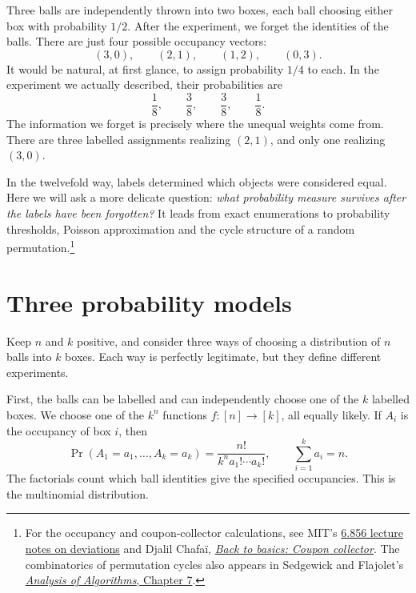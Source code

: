 
Three balls are independently thrown into two boxes, each ball choosing either box with probability \(1/2\). After the experiment, we forget the identities of the balls. There are just four possible occupancy vectors:
\[
 (3,0),\qquad(2,1),\qquad(1,2),\qquad(0,3).
\]
It would be natural, at first glance, to assign probability \(1/4\) to each. In the experiment we actually described, their probabilities are
\[
 \frac18,\qquad\frac38,\qquad\frac38,\qquad\frac18.
\]
The information we forget is precisely where the unequal weights come from. There are three labelled assignments realizing \((2,1)\), and only one realizing \((3,0)\).

In the twelvefold way, labels determined which objects were considered equal. Here we will ask a more delicate question: \emph{what probability measure survives after the labels have been forgotten?} It leads from exact enumerations to probability thresholds, Poisson approximation and the cycle structure of a random permutation.\footnote{For the occupancy and coupon-collector calculations, see MIT's \href{https://courses.csail.mit.edu/6.856/current/Notes/n05-deviations.html}{6.856 lecture notes on deviations} and Djalil Chafa\"i, \href{https://djalil.chafai.net/blog/2010/10/20/back-to-basics-coupon-collector/}{\emph{Back to basics: Coupon collector}}. The combinatorics of permutation cycles also appears in Sedgewick and Flajolet's \href{https://aofa.cs.princeton.edu/70permutations/}{\emph{Analysis of Algorithms}, Chapter 7}.}

\section{Three probability models}

Keep \(n\) and \(k\) positive, and consider three ways of choosing a distribution of \(n\) balls into \(k\) boxes. Each way is perfectly legitimate, but they define different experiments.

First, the balls can be labelled and can independently choose one of the \(k\) labelled boxes. We choose one of the \(k^n\) functions \(f:[n]\to[k]\), all equally likely. If \(A_i\) is the occupancy of box \(i\), then
\[
 \Pr(A_1=a_1,\ldots,A_k=a_k)
 =\frac{n!}{k^n a_1!\cdots a_k!},
 \qquad \sum_{i=1}^k a_i=n.
\]
The factorials count which ball identities give the specified occupancies. This is the multinomial distribution.

